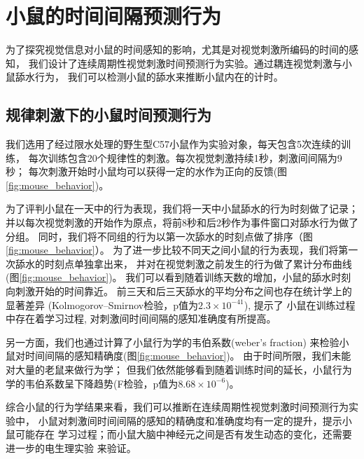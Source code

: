 
\section{小鼠的时间间隔预测行为}
为了探究视觉信息对小鼠的时间感知的影响，尤其是对视觉刺激所编码的时间的感知，
我们设计了连续周期性视觉刺激时间预测行为实验。通过耦连视觉刺激与小鼠舔水行为，
我们可以检测小鼠的舔水来推断小鼠内在的计时。

\subsection{规律刺激下的小鼠时间预测行为}
我们选用了经过限水处理的野生型C57小鼠作为实验对象，每天包含5次连续的训练，
每次训练包含20个规律性的刺激。每次视觉刺激持续1秒，刺激间间隔为9秒；
每次刺激开始时小鼠均可以获得一定的水作为正向的反馈(图\ref{fig:mouse_behavior})。

为了评判小鼠在一天中的行为表现，我们将一天中小鼠舔水的行为时刻做了记录；
并以每次视觉刺激的开始作为原点，将前8秒和后2秒作为事件窗口对舔水行为做了分组。
同时，我们将不同组的行为以第一次舔水的时刻点做了排序（图\ref{fig:mouse_behavior}）。
为了进一步比较不同天之间小鼠的行为表现，我们将第一次舔水的时刻点单独拿出来，
并对在视觉刺激之前发生的行为做了累计分布曲线(图\ref{fig:mouse_behavior})。
我们可以看到随着训练天数的增加，小鼠的舔水时刻向刺激开始的时间靠近。
前三天和后三天舔水的平均分布之间也存在统计学上的显著差异
(Kolmogorov–Smirnov检验，p值为$2.3 \times 10 ^ {-41}$), 提示了
小鼠在训练过程中存在着学习过程, 对刺激间时间间隔的感知准确度有所提高。

另一方面，我们也通过计算了小鼠行为学的韦伯系数(weber's fraction)
来检验小鼠对时间间隔的感知精确度(图\ref{fig:mouse_behavior})。
由于时间所限，我们未能对大量的老鼠来做行为学；
但我们依然能够看到随着训练时间的延长，小鼠行为学的韦伯系数呈下降趋势(F检验，p值为\(8.68\times 10^{-6}\))。

综合小鼠的行为学结果来看，我们可以推断在连续周期性视觉刺激时间预测行为实验中，
小鼠对刺激间时间间隔的感知的精确度和准确度均有一定的提升，提示小鼠可能存在
学习过程；而小鼠大脑中神经元之间是否有发生动态的变化，还需要进一步的电生理实验
来验证。

